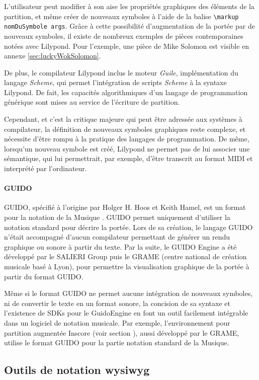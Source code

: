 L'utilisateur peut modifier à son aise les propriétés graphiques des éléments de la partition, et même créer de nouveaux symboles à l'aide de la balise \lstinline|\markup nomDuSymbole args|. Grâce à cette possibilité d'augmentation de la portée par de nouveaux symboles, il existe de nombreux exemples de pièces contemporaines notées avec Lilypond. Pour l'exemple, une pièce de Mike Solomon est visible en annexe \ref{sec:luckyWokSolomon}.

De plus, le compilateur Lilypond inclus le moteur \textit{Guile}, implémentation du langage \textit{Scheme}, qui permet l'intégration de scripts \textit{Scheme} à la syntaxe Lilypond. De fait, les capacités algorithmiques d'un langage de programmation générique sont mises au service de l'écriture de partition.

Cependant, et c'est la critique majeure qui peut être adressée aux systèmes à compilateur, la définition de nouveaux symboles graphiques reste complexe, et nécessite d'être rompu à la pratique des langages de programmation.
De même, lorsqu'un nouveau symbole est créé, Lilypond ne permet pas de lui associer une sémantique, qui lui permettrait, par exemple, d'être transcrit au format MIDI et interprété par l'ordinateur.

\paragraph{GUIDO} GUIDO, spécifié à l'origine par Holger H. Hoos et Keith Hamel, est un format pour la notation de la Musique \cite{hoos1998}. GUIDO permet uniquement d'utiliser la notation standard pour décrire la portée. Lors de sa création, le langage GUIDO n'était accompagné d'aucun compilateur permettant de générer un rendu graphique ou sonore à partir du texte. Par la suite, le GUIDO Engine a été développé par le SALIERI Group puis le GRAME (centre national de création musicale basé à Lyon), pour permettre la visualisation graphique de la portée à partir du format GUIDO. 

Même si le format GUIDO ne permet aucune intégration de nouveaux symboles, ni de convertir le texte en un format sonore, la concision de sa syntaxe et l'existence de SDKs pour le GuidoEngine en font un outil facilement intégrable dans un logiciel de notation musicale. Par exemple, l'environnement pour partition augmentée Inscore (voir section ), aussi développé par le GRAME, utilise le format GUIDO pour la partie notation standard de la Musique.    

\subsection{Outils de notation wysiwyg}
\label{subsec:outilsWysiwyg}

